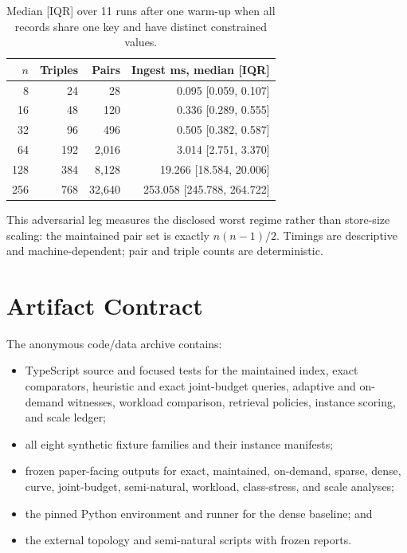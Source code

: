 \documentclass[letterpaper]{article}
\begin{document}
\begin{table}[t]
\centering
\scriptsize
\setlength{\tabcolsep}{2.3pt}
\begin{tabular}{rrrr}
\toprule
$n$ & Triples & Pairs & Ingest ms, median [IQR] \\
\midrule
8 & 24 & 28 & 0.095 [0.059, 0.107] \\
16 & 48 & 120 & 0.336 [0.289, 0.555] \\
32 & 96 & 496 & 0.505 [0.382, 0.587] \\
64 & 192 & 2,016 & 3.014 [2.751, 3.370] \\
128 & 384 & 8,128 & 19.266 [18.584, 20.006] \\
256 & 768 & 32,640 & 253.058 [245.788, 264.722] \\
\bottomrule
\end{tabular}
\caption{Median [IQR] over 11 runs after one warm-up when all records share one
key and have distinct constrained values.}
\end{table}

This adversarial leg measures the disclosed worst regime rather than store-size
scaling: the maintained pair set is exactly $n(n-1)/2$.  Timings are
descriptive and machine-dependent; pair and triple counts are deterministic.

\section{Artifact Contract}

The anonymous code/data archive contains:
\begin{itemize}
  \item TypeScript source and focused tests for the maintained index, exact
  comparators, heuristic and exact joint-budget queries, adaptive and
  on-demand witnesses, workload comparison, retrieval policies, instance
  scoring, and scale ledger;
  \item all eight synthetic fixture families and their instance manifests;
  \item frozen paper-facing outputs for exact, maintained, on-demand, sparse,
  dense, curve, joint-budget, semi-natural, workload, class-stress, and scale
  analyses;
  \item the pinned Python environment and runner for the dense baseline; and
  \item the external topology and semi-natural scripts with frozen reports.
\end{itemize}
\end{document}
